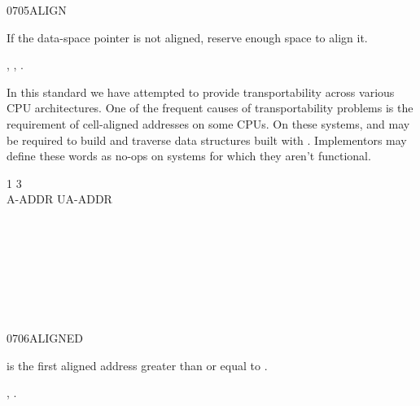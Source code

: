 \begin{worddef}{0705}{ALIGN}
\item \stack{}{}

	If the data-space pointer is not aligned, reserve enough space
	to align it.

\see {},
	,
	.

	\begin{rationale} %
		In this standard we have attempted to provide transportability
		across various CPU architectures. One of the frequent causes
		of transportability problems is the requirement of cell-aligned
		addresses on some CPUs. On these systems,  and
		 may be required to build and traverse data
		structures built with . Implementors may define these
		words as no-ops on systems for which they aren't functional.
	\end{rationale}

	\begin{testing} %
		\ttfamily
		  1      3   \\
		 A-ADDR   UA-ADDR \\
		 \\
		 \\
		 \\
		 \\
		 \\
		 \\
		 \\
	\end{testing}
\end{worddef}


\begin{worddef}{0706}{ALIGNED}
\item {}

	 is the first aligned address greater than or equal
	to .

\see {},
	.
\end{worddef}


